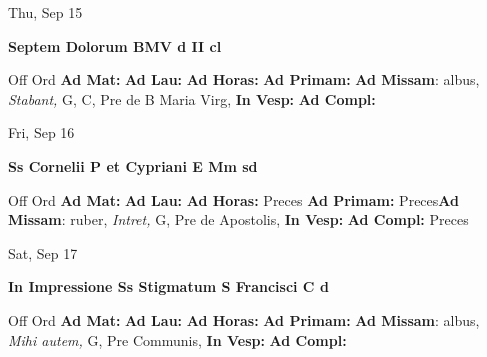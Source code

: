 \documentclass[10pt]{memoir}
\begin{document}
\begin{center}
\begin{minipage}{3.5in}
\vspace{2em}
\begin{center}Thu, Sep 15
\end{center}
\textbf{ \large Septem Dolorum BMV
\textnormal{\normalsize d II cl}}

\begin{justify}Off Ord
\textbf{Ad Mat: }
\textbf{Ad Lau: }
\textbf{Ad Horas: }
\textbf{Ad Primam: }\textbf{Ad Missam}: albus, \textit{Stabant,} G, C, Pre de B Maria Virg, 
\textbf{In Vesp: }
\textbf{Ad Compl: }
\end{justify}
\end{minipage}
\end{center}

\begin{center}
\begin{minipage}{3.5in}
\vspace{2em}
\begin{center}Fri, Sep 16
\end{center}
\textbf{ \large Ss Cornelii P et Cypriani E Mm
\textnormal{\normalsize sd}}

\begin{justify}Off Ord
\textbf{Ad Mat: }
\textbf{Ad Lau: }
\textbf{Ad Horas: }Preces
\textbf{Ad Primam: }Preces\textbf{Ad Missam}: ruber, \textit{Intret,} G, Pre de Apostolis, 
\textbf{In Vesp: }
\textbf{Ad Compl: }Preces
\end{justify}
\end{minipage}
\end{center}

\begin{center}
\begin{minipage}{3.5in}
\vspace{2em}
\begin{center}Sat, Sep 17
\end{center}
\textbf{ \large In Impressione Ss Stigmatum S Francisci C
\textnormal{\normalsize d}}

\begin{justify}Off Ord
\textbf{Ad Mat: }
\textbf{Ad Lau: }
\textbf{Ad Horas: }
\textbf{Ad Primam: }\textbf{Ad Missam}: albus, \textit{Mihi autem,} G, Pre Communis, 
\textbf{In Vesp: }
\textbf{Ad Compl: }
\end{justify}
\end{minipage}
\end{center}
\end{document}
